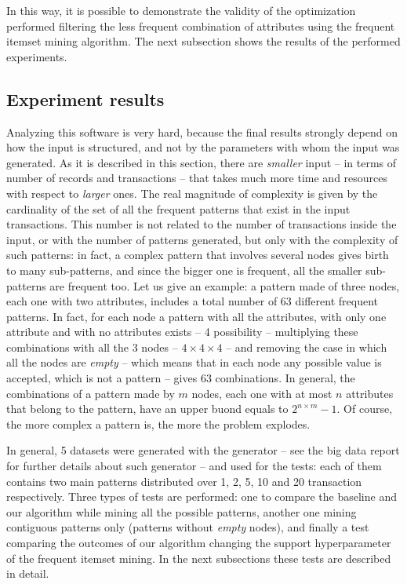 \documentclass{acm_proc_article-sp-sigmod09}
\begin{document}
In this way, it is possible to demonstrate the validity of the optimization performed filtering the less frequent combination of attributes using the frequent itemset mining algorithm. The next subsection shows the results of the performed experiments.

\subsection{Experiment results}
\label{sec:exp-res}
Analyzing this software is very hard, because the final results strongly depend on how the input is structured, and not by the parameters with whom the input was generated. As it is described in this section, there are \emph{smaller} input -- in terms of number of records and transactions -- that takes much more time and resources with respect to \emph{larger} ones. The real magnitude of complexity is given by the cardinality of the set of all the frequent patterns that exist in the input transactions. This number is not related to the number of transactions inside the input, or with the number of patterns generated, but only with the complexity of such patterns: in fact, a complex pattern that involves several nodes gives birth to many sub-patterns, and since the bigger one is frequent, all the smaller sub-patterns are frequent too. Let us give an example: a pattern made of three nodes, each one with two attributes, includes a total number of 63 different frequent patterns. In fact, for each node a pattern with all the attributes, with only one attribute and with no attributes exists -- 4 possibility -- multiplying these combinations with all the 3 nodes -- $4 \times 4 \times 4$ -- and removing the case in which all the nodes are \emph{empty} -- which means that in each node any possible value is accepted, which is not a pattern -- gives 63 combinations. In general, the combinations of a pattern made by $m$ nodes, each one with at most $n$ attributes that belong to the pattern, have an upper buond equals to $2^{n \times m} - 1$. Of course, the more complex a pattern is, the more the problem explodes.

In general, 5 datasets were generated with the generator -- see the big data report for further details about such generator -- and used for the tests: each of them contains two main patterns distributed over 1, 2, 5, 10 and 20 transaction respectively. Three types of tests are performed: one to compare the baseline and our algorithm while mining all the possible patterns, another one mining contiguous patterns only (patterns without \emph{empty} nodes), and finally a test comparing the outcomes of our algorithm changing the support hyperparameter of the frequent itemset mining. In the next subsections these tests are described in detail.
\end{document}
